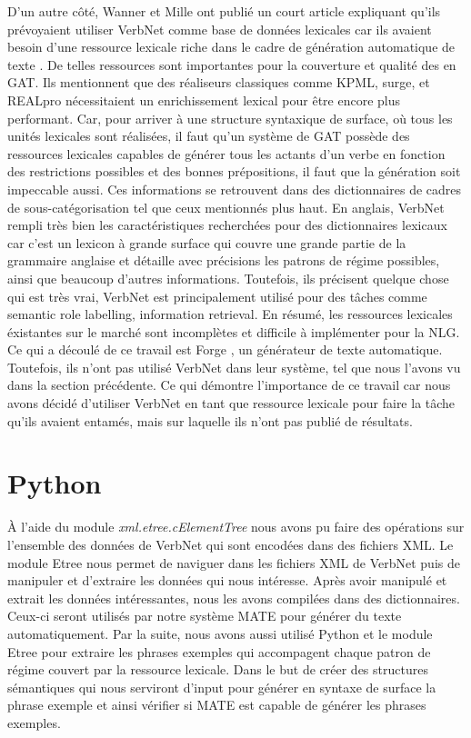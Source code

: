 D'un autre côté, Wanner et Mille ont publié un court article expliquant qu'ils prévoyaient utiliser VerbNet comme base de données lexicales car ils avaient besoin d'une ressource lexicale riche dans le cadre de génération automatique de texte \citep{MilleLargeCoverageDetailed2015}. De telles ressources sont importantes pour la couverture et qualité des en GAT. Ils mentionnent que des réaliseurs classiques comme KPML, surge, et REALpro nécessitaient un enrichissement lexical pour être encore plus performant. Car, pour arriver à une structure syntaxique de surface, où tous les unités lexicales sont réalisées, il faut qu'un système de GAT possède des ressources lexicales capables de générer tous les actants d'un verbe en fonction des restrictions possibles et des bonnes prépositions, il faut que la génération soit impeccable aussi. Ces informations se retrouvent dans des dictionnaires de cadres de sous-catégorisation tel que ceux mentionnés plus haut. En anglais, VerbNet rempli très bien les caractéristiques recherchées pour des dictionnaires lexicaux car c'est un lexicon à grande surface qui couvre une grande partie de la grammaire anglaise et détaille avec précisions les patrons de régime possibles, ainsi que beaucoup d'autres informations. Toutefois, ils précisent quelque chose qui est très vrai, VerbNet est principalement utilisé pour des tâches comme semantic role labelling, information retrieval. En résumé, les ressources lexicales éxistantes sur le marché sont incomplètes et difficile à implémenter pour la NLG. Ce qui a découlé de ce travail est Forge \citep{DBLP:conf/semeval/MilleCBW17}, un générateur de texte automatique. Toutefois, ils n'ont pas utilisé VerbNet dans leur système, tel que nous l'avons vu dans la section précédente. Ce qui démontre l'importance de ce travail car nous avons décidé d'utiliser VerbNet en tant que ressource lexicale pour faire la tâche qu'ils avaient entamés, mais sur laquelle ils n'ont pas publié de résultats.
 


\section{Python}

À l'aide du module \emph{xml.etree.cElementTree} nous avons pu faire des opérations sur l'ensemble des données de VerbNet qui sont encodées dans des fichiers XML. Le module Etree nous permet de naviguer dans les fichiers XML de VerbNet puis de manipuler et d'extraire les données qui nous intéresse. Après avoir manipulé et extrait les données intéressantes, nous les avons compilées dans des dictionnaires. Ceux-ci seront utilisés par notre système MATE pour générer du texte automatiquement. Par la suite, nous avons aussi utilisé Python et le module Etree pour extraire les phrases exemples qui accompagent chaque patron de régime couvert par la ressource lexicale. Dans le but de créer des structures sémantiques qui nous serviront d'input pour générer en syntaxe de surface la phrase exemple et ainsi vérifier si MATE est capable de générer les phrases exemples.

